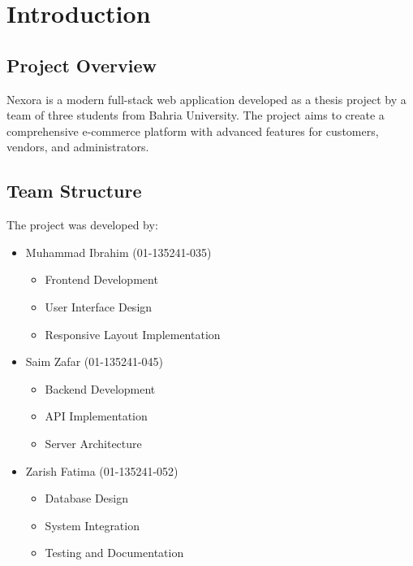 \chapter{Introduction}\label{chap:introduction}

\section{Project Overview}
Nexora is a modern full-stack web application developed as a thesis project by a team of three students from Bahria University. The project aims to create a comprehensive e-commerce platform with advanced features for customers, vendors, and administrators.

\section{Team Structure}
The project was developed by:
\begin{itemize}
    \item Muhammad Ibrahim (01-135241-035)
    \begin{itemize}
        \item Frontend Development
        \item User Interface Design
        \item Responsive Layout Implementation
    \end{itemize}
    \item Saim Zafar (01-135241-045)
    \begin{itemize}
        \item Backend Development
        \item API Implementation
        \item Server Architecture
    \end{itemize}
    \item Zarish Fatima (01-135241-052)
    \begin{itemize}
        \item Database Design
        \item System Integration
        \item Testing and Documentation
    \end{itemize}
\end{itemize}

